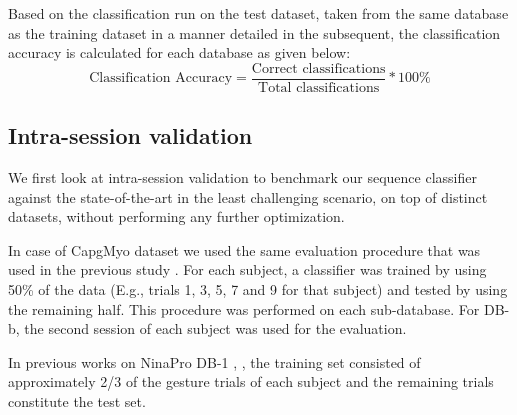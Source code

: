 \documentclass[conference]{IEEEtran}
\begin{document}
Based on the classification run on the test dataset, taken from the same database as the training dataset in a manner detailed in the subsequent, the classification accuracy is calculated for each database as given below:
\begin{equation}
  \label{eq:classification_accuracy}
  \mbox{Classification Accuracy} = \dfrac{\mbox{Correct classifications}}{\mbox{Total classifications}}*100\%
\end{equation}

\subsection{Intra-session validation}

We first look at intra-session validation to benchmark our sequence classifier against the state-of-the-art in the least challenging scenario, on top of distinct datasets, without performing any further optimization.

In case of CapgMyo dataset we used the same evaluation procedure that was used in the previous study \cite{b18}.
For each subject, a classifier was trained by using 50\% of the data (E.g., trials 1, 3, 5, 7 and 9 for that subject) and tested by using the remaining half.
This procedure was performed on each sub-database. For DB-b, the second session of each subject was used for the evaluation.

In previous works on NinaPro DB-1 \cite{b23}, \cite{b18}, the training set consisted of approximately 2/3 of the gesture trials of each subject and the remaining trials constitute the test set.
\end{document}
